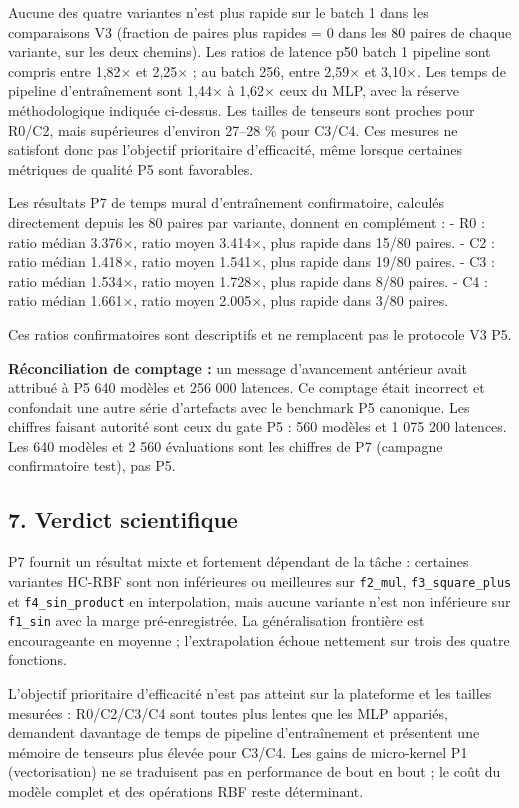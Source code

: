 \documentclass[
]{article}
\begin{document}
Aucune des quatre variantes n'est plus rapide sur le batch 1 dans les
comparaisons V3 (fraction de paires plus rapides = 0 dans les 80 paires
de chaque variante, sur les deux chemins). Les ratios de latence p50
batch 1 pipeline sont compris entre 1,82× et 2,25× ; au batch 256, entre
2,59× et 3,10×. Les temps de pipeline d'entraînement sont 1,44× à 1,62×
ceux du MLP, avec la réserve méthodologique indiquée ci-dessus. Les
tailles de tenseurs sont proches pour R0/C2, mais supérieures d'environ
27--28 \% pour C3/C4. Ces mesures ne satisfont donc pas l'objectif
prioritaire d'efficacité, même lorsque certaines métriques de qualité P5
sont favorables.

Les résultats P7 de temps mural d'entraînement confirmatoire, calculés
directement depuis les 80 paires par variante, donnent en complément : -
R0 : ratio médian 3.376×, ratio moyen 3.414×, plus rapide dans 15/80
paires. - C2 : ratio médian 1.418×, ratio moyen 1.541×, plus rapide dans
19/80 paires. - C3 : ratio médian 1.534×, ratio moyen 1.728×, plus
rapide dans 8/80 paires. - C4 : ratio médian 1.661×, ratio moyen 2.005×,
plus rapide dans 3/80 paires.

Ces ratios confirmatoires sont descriptifs et ne remplacent pas le
protocole V3 P5.

\textbf{Réconciliation de comptage :} un message d'avancement antérieur
avait attribué à P5 640 modèles et 256 000 latences. Ce comptage était
incorrect et confondait une autre série d'artefacts avec le benchmark P5
canonique. Les chiffres faisant autorité sont ceux du gate P5 : 560
modèles et 1 075 200 latences. Les 640 modèles et 2 560 évaluations sont
les chiffres de P7 (campagne confirmatoire test), pas P5.

\subsection{7. Verdict scientifique}\label{verdict-scientifique}

P7 fournit un résultat mixte et fortement dépendant de la tâche :
certaines variantes HC-RBF sont non inférieures ou meilleures sur
\texttt{f2\_mul}, \texttt{f3\_square\_plus} et \texttt{f4\_sin\_product}
en interpolation, mais aucune variante n'est non inférieure sur
\texttt{f1\_sin} avec la marge pré-enregistrée. La généralisation
frontière est encourageante en moyenne ; l'extrapolation échoue
nettement sur trois des quatre fonctions.

L'objectif prioritaire d'efficacité n'est pas atteint sur la plateforme
et les tailles mesurées : R0/C2/C3/C4 sont toutes plus lentes que les
MLP appariés, demandent davantage de temps de pipeline d'entraînement et
présentent une mémoire de tenseurs plus élevée pour C3/C4. Les gains de
micro-kernel P1 (vectorisation) ne se traduisent pas en performance de
bout en bout ; le coût du modèle complet et des opérations RBF reste
déterminant.
\end{document}
